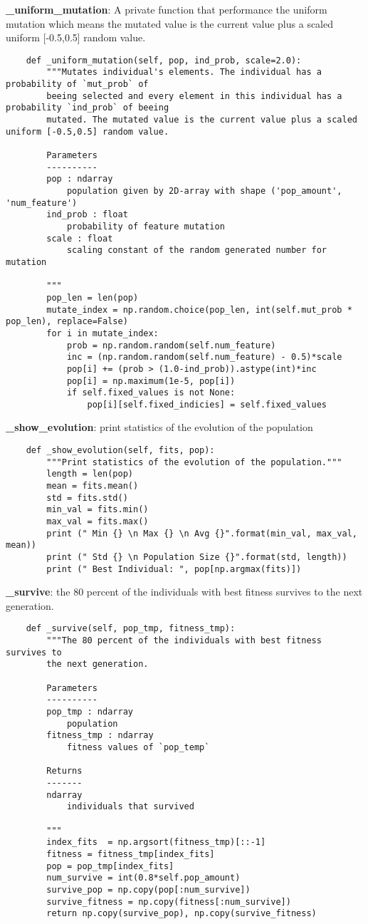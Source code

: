 \documentclass[12pt]{article}
\begin{document}
\textbf{\_uniform\_mutation}: A private function that performance the uniform mutation which means the mutated value is the current value plus a scaled uniform [-0.5,0.5] random value.
\begin{verbatim}
	def _uniform_mutation(self, pop, ind_prob, scale=2.0):
		"""Mutates individual's elements. The individual has a probability of `mut_prob` of
		beeing selected and every element in this individual has a probability `ind_prob` of beeing
		mutated. The mutated value is the current value plus a scaled uniform [-0.5,0.5] random value.

		Parameters
		----------
		pop : ndarray
			population given by 2D-array with shape ('pop_amount', 'num_feature')
	    ind_prob : float
	    	probability of feature mutation
	    scale : float
	    	scaling constant of the random generated number for mutation

	    """
		pop_len = len(pop)
		mutate_index = np.random.choice(pop_len, int(self.mut_prob * pop_len), replace=False)
		for i in mutate_index:
			prob = np.random.random(self.num_feature)
			inc = (np.random.random(self.num_feature) - 0.5)*scale
			pop[i] += (prob > (1.0-ind_prob)).astype(int)*inc
			pop[i] = np.maximum(1e-5, pop[i])
			if self.fixed_values is not None:
				pop[i][self.fixed_indicies] = self.fixed_values
\end{verbatim}
\textbf{\_show\_evolution}: print statistics of the evolution of the population
\begin{verbatim}
	def _show_evolution(self, fits, pop):
		"""Print statistics of the evolution of the population."""
		length = len(pop)
		mean = fits.mean()
		std = fits.std()
		min_val = fits.min()
		max_val = fits.max()
		print (" Min {} \n Max {} \n Avg {}".format(min_val, max_val, mean))
		print (" Std {} \n Population Size {}".format(std, length))
		print (" Best Individual: ", pop[np.argmax(fits)])
\end{verbatim}
\textbf{\_survive}: the 80 percent of the individuals with best fitness survives to
		the next generation.
\begin{verbatim}
	def _survive(self, pop_tmp, fitness_tmp):
		"""The 80 percent of the individuals with best fitness survives to
		the next generation.

		Parameters
		----------
		pop_tmp : ndarray
			population
		fitness_tmp : ndarray
			fitness values of `pop_temp`

		Returns
		-------
		ndarray
			individuals that survived

		"""
		index_fits  = np.argsort(fitness_tmp)[::-1]
		fitness = fitness_tmp[index_fits]
		pop = pop_tmp[index_fits]
		num_survive = int(0.8*self.pop_amount)
		survive_pop = np.copy(pop[:num_survive])
		survive_fitness = np.copy(fitness[:num_survive])
		return np.copy(survive_pop), np.copy(survive_fitness)
\end{verbatim}
\end{document}

